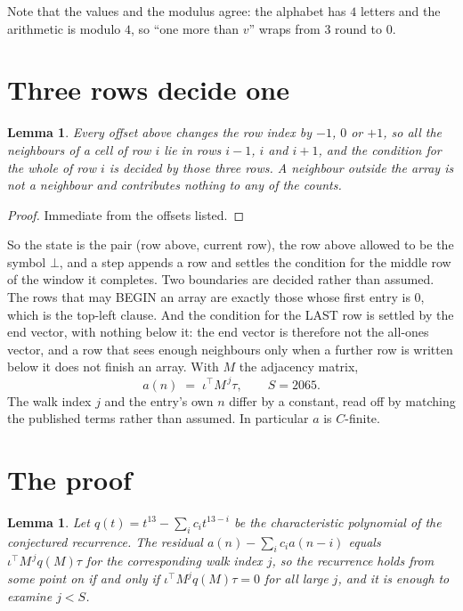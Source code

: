 \documentclass[11pt,a4paper]{article}
\theoremstyle{plain}
\newtheorem{lemma}[theorem]{Lemma}
\theoremstyle{definition}
\begin{document}
Note that the values and the modulus agree: the alphabet has $4$ letters and the arithmetic
is modulo $4$, so ``one more than $v$'' wraps from $3$ round to $0$.

\section{Three rows decide one}

\begin{lemma}\label{lem:win}
Every offset above changes the row index by $-1$, $0$ or $+1$, so all the neighbours of a cell
of row $i$ lie in rows $i-1$, $i$ and $i+1$, and the condition for the whole of row $i$ is
decided by those three rows. A neighbour outside the array is not a neighbour and contributes
nothing to any of the counts.
\end{lemma}

\begin{proof}
Immediate from the offsets listed.
\end{proof}

So the state is the pair (row above, current row), the row above allowed to be the symbol
$\bot$, and a step appends a row and settles the condition for the middle row of the window it
completes. Two boundaries are decided rather than assumed. The rows that may BEGIN an array are
exactly those whose first entry is $0$, which is the top-left clause. And the condition for the
LAST row is settled by the end vector, with nothing below it: the end vector is therefore not
the all-ones vector, and a row that sees enough neighbours only when a further row is written
below it does not finish an array. With $M$ the adjacency matrix,
\[
a(n)\;=\;\iota^{\!\top}M^{\,j}\tau ,\qquad S=2065.
\]
The walk index $j$ and the entry's own $n$ differ by a constant, read off by matching the
published terms rather than assumed. In particular $a$ is $C$-finite.

\section{The proof}

\begin{lemma}\label{lem:crit}
Let $q(t)=t^{13}-\sum_i c_it^{13-i}$ be the characteristic polynomial of the
conjectured recurrence. The residual $a(n)-\sum_ic_ia(n-i)$ equals
$\iota^{\!\top}M^{\,j}q(M)\tau$ for the corresponding walk index $j$, so the recurrence
holds from some point on if and only if $\iota^{\!\top}M^{j}q(M)\tau=0$ for all large $j$,
and it is enough to examine $j<S$.
\end{lemma}
\end{document}
